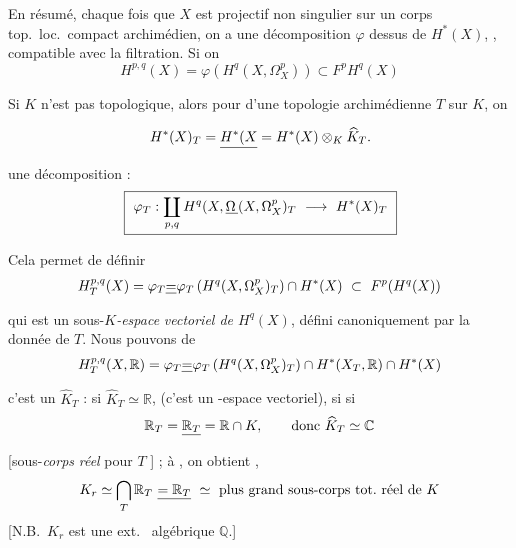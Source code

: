 \documentclass[11pt,a4paper]{article}
\begin{document}
En résumé, chaque fois que $X$ est projectif non singulier sur un corps
 top.\ loc.\ compact  archimédien, on a une
décomposition $\varphi$  dessus de $H^{*}(X)$, \ill{},
compatible avec la filtration. Si on  
\[
  H^{p,q}(X) = \varphi\left(H^{q}(X, \Omega^{p}_{X})\right) \subset F^{p} H^{q}(X)
\]

Si $K$ n'est pas  topologique, alors pour 
 d'une  topologie 
archimédienne $T$ sur $K$, on  \ill{}



\[
  H^{*}(X)_{T} = \struck{H^{*}(X} = H^{*}(X) \otimes_{K} \widehat{K}_{T}.
\]
une décomposition :
\[
  \boxed{\ \varphi_{T} : \coprod_{p,q} H^{q}(X, \struck{\Omega\,}(X, \Omega^{p}_{X})_{T} \ \longrightarrow\ H^{*}(X)_{T}\ }
\]

Cela permet de  définir
\[
  H^{p,q}_{T}(X) = \varphi_{T} \struck{=} \varphi_{T}\left(H^{q}(X, \Omega^{p}_{X})_{T}\right) \cap H^{*}(X) \ \subset\ F^{p}\!\left(H^{q}(X)\right)
\]
qui est un sous-\emph{$K$-espace}  \emph{vectoriel de
$H^{q}(X)$}, défini canoniquement  par la donnée de $T$. Nous
pouvons de \struck{$=$}
\[
  H^{p,q}_{T}(X, \mathbb{R}) = \varphi_{T} \struck{=} \varphi_{T}\left(H^{q}(X, \Omega^{p}_{X})_{T}\right) \cap H^{*}(X_{T}, \mathbb{R}) \cap H^{*}(X)
\]
c'est \ill{} un \ill{} $\widehat{K}_{T}$ : 
si $\widehat{K}_{T} \simeq \mathbb{R}$, \ill{} \ill{} (c'est un \ill{}
 -espace vectoriel), si
\ill{} si
\[
  \mathbb{R}_{T} = \struck{\mathbb{R}_{T}} = \mathbb{R} \cap K, \qquad \text{donc } \widehat{K}_{T} \simeq \mathbb{C}
\]
[sous-\emph{corps} \struck{\ill{}} \emph{réel} pour $T$ ] ; à
, \ill{} \ill{} \ill{} on \ill{} obtient
  \struck{\ill{}} \ill{}, \ill{}
\[
  K_{r} \simeq \bigcap_{T} \mathbb{R}_{T} \ \struck{= \mathbb{R}_{T}} \ \simeq\ \text{plus grand sous-corps tot.\ réel de } K
\]
[N.B.\ $K_{r}$ est une ext.\  algébrique \ill{}
  $\mathbb{Q}$.]

\end{document}
